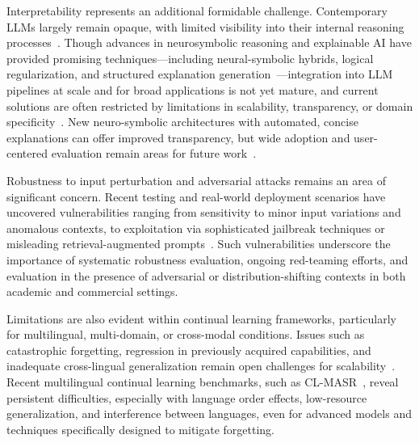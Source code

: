 \documentclass[sigconf]{acmart}
\begin{document}
Interpretability represents an additional formidable challenge. Contemporary LLMs largely remain opaque, with limited visibility into their internal reasoning processes~\cite{ref24,ref34,ref37,ref38,ref41,ref43,ref48,ref54,ref89,ref92,ref93,ref94}. Though advances in neurosymbolic reasoning and explainable AI have provided promising techniques---including neural-symbolic hybrids, logical regularization, and structured explanation generation~\cite{ref43,ref48,ref49,ref92,ref93,ref89,ref54}---integration into LLM pipelines at scale and for broad applications is not yet mature, and current solutions are often restricted by limitations in scalability, transparency, or domain specificity~\cite{ref48,ref54,ref89,ref93}. New neuro-symbolic architectures with automated, concise explanations can offer improved transparency, but wide adoption and user-centered evaluation remain areas for future work~\cite{ref93}.

Robustness to input perturbation and adversarial attacks remains an area of significant concern. Recent testing and real-world deployment scenarios have uncovered vulnerabilities ranging from sensitivity to minor input variations and anomalous contexts, to exploitation via sophisticated jailbreak techniques or misleading retrieval-augmented prompts~\cite{ref13,ref39,ref55,ref56,ref60,ref77,ref78,ref82,ref91}. Such vulnerabilities underscore the importance of systematic robustness evaluation, ongoing red-teaming efforts, and evaluation in the presence of adversarial or distribution-shifting contexts in both academic and commercial settings.

Limitations are also evident within continual learning frameworks, particularly for multilingual, multi-domain, or cross-modal conditions. Issues such as catastrophic forgetting, regression in previously acquired capabilities, and inadequate cross-lingual generalization remain open challenges for scalability~\cite{ref70,ref80,ref81,ref82,ref83,ref102}. Recent multilingual continual learning benchmarks, such as CL-MASR~\cite{ref102}, reveal persistent difficulties, especially with language order effects, low-resource generalization, and interference between languages, even for advanced models and techniques specifically designed to mitigate forgetting.
\end{document}
